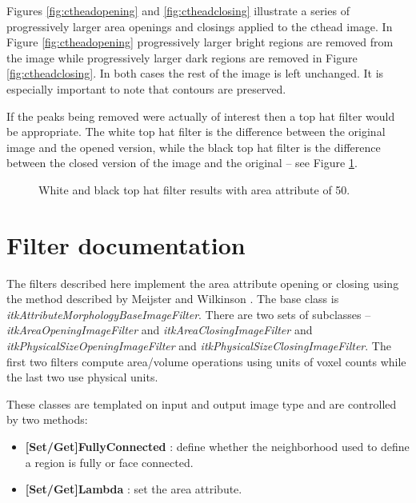 \documentclass{InsightArticle}
\begin{document}
Figures \ref{fig:ctheadopening} and \ref{fig:ctheadclosing} illustrate
a series of progressively larger area openings and closings applied to
the cthead image. In Figure \ref{fig:ctheadopening} progressively
larger bright regions are removed from the image while progressively
larger dark regions are removed in Figure \ref{fig:ctheadclosing}. In
both cases the rest of the image is left unchanged. It is especially
important to note that contours are preserved.

If the peaks being removed were actually of interest then a top hat
filter would be appropriate. The white top hat filter is the
difference between the original image and the opened version, while
the black top hat filter is the difference between the closed version
of the image and the original -- see Figure \ref{fig:ctheadtophat}.
\begin{figure}[htbp]
\begin{center}
\caption{White and black top hat filter results with area attribute of 50.\label{fig:ctheadtophat}}
\end{center}
\end{figure}

\section{Filter documentation}
The filters described here implement the area attribute opening or
closing using the method described by Meijster and Wilkinson
\cite{meijster02}. The base class is {\em
itkAttributeMorphologyBaseImageFilter}. There are two sets of
subclasses -- {\em itkAreaOpeningImageFilter} and {\em
itkAreaClosingImageFilter} and {\em itkPhysicalSizeOpeningImageFilter}
and {\em itkPhysicalSizeClosingImageFilter}. The first two filters
compute area/volume operations using units of voxel counts while the
last two use physical units.

These classes are templated on input and output image type and are
controlled by two methods:
\begin{itemize}
\item {\bf [Set/Get]FullyConnected} : define whether the neighborhood used to define a region is fully or face connected.
\item {\bf [Set/Get]Lambda} : set the area attribute.
\end{itemize}


\appendix





\nocite{ITKSoftwareGuide}
\end{document}

